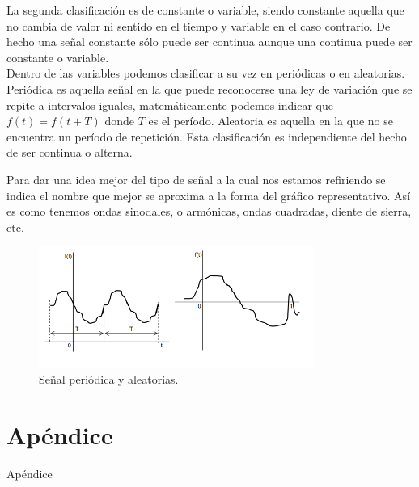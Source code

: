 La segunda clasificación es de constante o variable, siendo constante aquella que no cambia de valor ni sentido en el tiempo y variable en el caso contrario. De hecho una señal constante sólo puede ser continua aunque una continua puede ser constante o variable.\\

Dentro de las variables podemos clasificar a su vez en periódicas o en aleatorias. Periódica es aquella señal en la que puede reconocerse una ley de variación que se repite a intervalos iguales, matemáticamente podemos indicar que $f(t) = f(t+T)$ donde $T$ es el período. Aleatoria es aquella en la que no se encuentra un período de repetición. Esta clasificación es independiente del hecho de ser continua o alterna.

Para dar una idea mejor del tipo de señal a la cual nos estamos refiriendo se indica el nombre que mejor se aproxima a la forma del gráfico representativo. Así es como tenemos ondas sinodales, o armónicas, ondas cuadradas, diente de sierra, etc.

\begin{figure}[H]
\centering
\includegraphics[width=9cm]{periodo.png}
\caption{Señal periódica y aleatorias.}
\end{figure}

\section{Apéndice}

Apéndice
